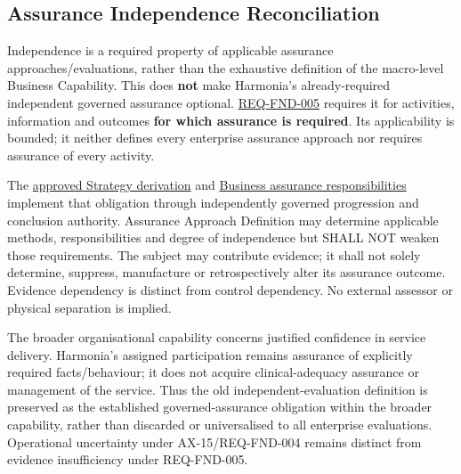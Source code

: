 \label{rad:business:1073}
\subsection*{Assurance Independence Reconciliation}
\label{rad:business:1075}

Independence is a required property of applicable assurance approaches/\allowbreak{}evaluations, rather than the exhaustive definition of the macro-level Business Capability. This does \textbf{not} make Harmonia's already-required independent governed assurance optional. \href{https://github.com/fhirfactory/harmonia/blob/98410db60155198a75f74c79d98060070209faa1/docs/markdown/01-motivation/requirements-constraints/foundational-requirements.md\#req-fnd-005-independent-assurance-of-governed-activity}{REQ-FND-005} requires it for activities, information and outcomes \textbf{for which assurance is required}. Its applicability is bounded; it neither defines every enterprise assurance approach nor requires assurance of every activity.

\label{rad:business:1083}

The \hyperref[rad:assurance-strategy]{approved Strategy derivation} and \hyperref[rad:assurance]{Business assurance responsibilities} implement that obligation through independently governed progression and conclusion authority. Assurance Approach Definition may determine applicable methods, responsibilities and degree of independence but SHALL NOT weaken those requirements. The subject may contribute evidence; it shall not solely determine, suppress, manufacture or retrospectively alter its assurance outcome. Evidence dependency is distinct from control dependency. No external assessor or physical separation is implied.

\label{rad:business:1093}

The broader organisational capability concerns justified confidence in service delivery. Harmonia's assigned participation remains assurance of explicitly required facts/\allowbreak{}behaviour; it does not acquire clinical-adequacy assurance or management of the service. Thus the old independent-evaluation definition is preserved as the established governed-assurance obligation within the broader capability, rather than discarded or universalised to all enterprise evaluations. Operational uncertainty under AX-15/\allowbreak{}REQ-FND-004 remains distinct from evidence insufficiency under REQ-FND-005.

\label{rad:business:1102}
